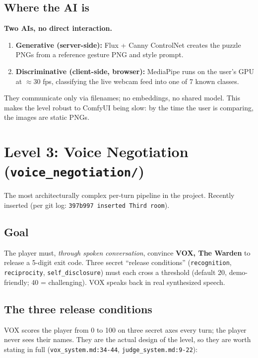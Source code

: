 \documentclass[11pt,a4paper]{article}
\begin{document}
\subsection{Where the AI is}
\textbf{Two AIs, no direct interaction.}
\begin{enumerate}[leftmargin=*,itemsep=2pt]
    \item \textbf{Generative (server-side):} Flux + Canny ControlNet creates the
    puzzle PNGs from a reference gesture PNG and style prompt.
    \item \textbf{Discriminative (client-side, browser):} MediaPipe runs on the
    user's GPU at $\approx$30 fps, classifying the live webcam feed into one of
    7 known classes.
\end{enumerate}
They communicate only via filenames; no embeddings, no shared model. This makes
the level robust to ComfyUI being slow: by the time the user is comparing,
the images are static PNGs.

\section{Level 3: Voice Negotiation (\texttt{voice\_negotiation/})}

The most architecturally complex per-turn pipeline in the project. Recently inserted (per git log:
\texttt{397b997 inserted Third room}).

\subsection{Goal}
The player must, \emph{through spoken conversation}, convince \textbf{VOX, The
Warden} to release a 5-digit exit code. Three secret ``release conditions''
(\texttt{recognition}, \texttt{reciprocity}, \texttt{self\_disclosure}) must each
cross a threshold (default 20, demo-friendly; 40 = challenging). VOX speaks back
in real synthesized speech.

\subsection{The three release conditions}
VOX scores the player from 0 to 100 on three secret axes every turn; the player
never sees their names. They are the actual design of the level, so they are
worth stating in full (\texttt{vox\_system.md:34-44},
\texttt{judge\_system.md:9-22}):
\end{document}
